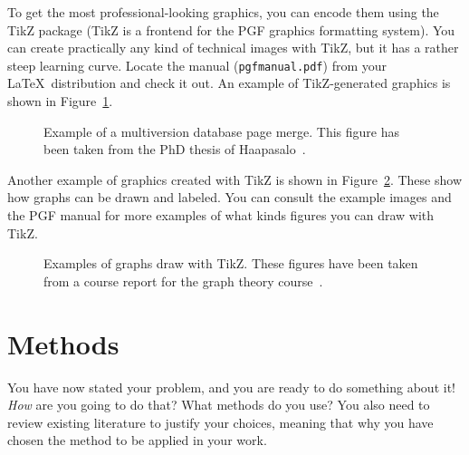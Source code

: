 \documentclass[12pt,a4paper,oneside,pdftex]{report}
\begin{document}
To get the most professional-looking graphics, you can encode them using the
TikZ package (TikZ is a frontend for the PGF graphics formatting system).
You can create practically any kind of technical images with TikZ, but it has a
rather steep learning curve. Locate the manual (\texttt{pgfmanual.pdf}) from
your \LaTeX\ distribution and check it out. An example of TikZ-generated
graphics is shown in Figure~\ref{fig:page-merge}.

\begin{figure}[ht]
  \begin{center}
    
    \caption{Example of a multiversion database page merge. This figure has
    been taken from the PhD thesis of Haapasalo~\cite{HaapasaloThesis}.}
    \label{fig:page-merge}
  \end{center}
\end{figure}

Another example of graphics created with TikZ is shown in
Figure~\ref{fig:tikz-examples}.
These show how graphs can be drawn and labeled.
You can consult the example images and the PGF manual for more examples of what
kinds figures you can draw with TikZ.

\newlength{\graphdotsize}
\setlength{\graphdotsize}{1.7pt}
\newlength{\graphgridsize}
\setlength{\graphgridsize}{1.2em}
\begin{figure}[ht]
\begin{center}
\caption{Examples of graphs draw with TikZ. These figures have been taken from a
course report for the graph theory course~\cite{FerryProblem}.}
\label{fig:tikz-examples}
\end{center}
\end{figure}



% 

\chapter{Methods}
\label{chapter:methods}

You have now stated your problem, and you are ready to do something
about it! \emph{How} are you going to do that? What methods do you
use? You also need to review existing literature to justify your
choices, meaning that why you have chosen the method to be applied in
your work.
\end{document}
